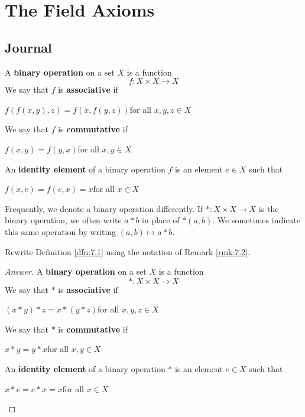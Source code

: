 \documentclass[../main.tex]{subfiles}
\begin{document}
\chapter{The Field Axioms}\label{sct:7}
\section{Journal}
\begin{definition}\label{dfn:7.1}
    A \textbf{binary operation} on a set $X$ is a function
    \begin{equation*}
        f:X\times X\to X
    \end{equation*}
    We say that $f$ is \textbf{associative} if
    \begin{center}
        $f(f(x,y),z)=f(x,f(y,z))$\quad for all $x,y,z\in X$
    \end{center}
    We say that $f$ is \textbf{commutative} if
    \begin{center}
        $f(x,y)=f(y,x)$\quad for all $x,y\in X$
    \end{center}
    An \textbf{identity element} of a binary operation $f$ is an element $e\in X$ such that
    \begin{center}
        $f(x,e)=f(e,x)=x$\quad for all $x\in X$
    \end{center}
\end{definition}

\begin{remark}\label{rmk:7.2}
    Frequently, we denote a binary operation differently. If $*:X\times X\to X$ is the binary operation, we often write $a*b$ in place of $*(a,b)$. We sometimes indicate this same operation by writing $(a,b)\mapsto a*b$.
\end{remark}

\begin{exercise}\label{exr:7.3}
    Rewrite Definition \ref{dfn:7.1} using the notation of Remark \ref{rmk:7.2}.
    \begin{proof}[Answer]
        A \textbf{binary operation} on a set $X$ is a function
        \begin{equation*}
            *:X\times X\to X
        \end{equation*}
        We say that $*$ is \textbf{associative} if
        \begin{center}
            $(x*y)*z=x*(y*z)$\quad for all $x,y,z\in X$
        \end{center}
        We say that $*$ is \textbf{commutative} if
        \begin{center}
            $x*y=y*x$\quad for all $x,y\in X$
        \end{center}
        An \textbf{identity element} of a binary operation $*$ is an element $e\in X$ such that
        \begin{center}
            $x*e=e*x=x$\quad for all $x\in X$
        \end{center}
    \end{proof}
\end{exercise}
\end{document}
